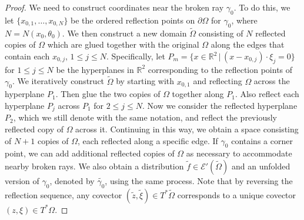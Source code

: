 \documentclass[10pt]{amsart}
\theoremstyle{definition}
\theoremstyle{definition}
\theoremstyle{definition}
\newcommand{ \rn }[1]{\mathbb{R}^{#1}}
\begin{document}
\begin{proof}We need to construct coordinates near the broken ray $\gamma_{0}$. To do this, we let $\{x_{0,1},\ldots, x_{0,N}\}$ be the ordered reflection points on $\partial \Omega$ for $\gamma_{0}$, where $N = N(x_{0}, \theta_{0})$. We then construct a new domain $\widetilde{\Omega}$ consisting of $N$ reflected copies of $\Omega$ which are glued together with the original $\Omega$ along the edges that contain each $x_{0,j}$, $1 \leq j \leq N$. Specifically, let $P_{m}= \{x \in \rn{2} \, | \, (x-x_{0,j}) \cdot \xi_{j} = 0\}$ for $1 \leq j \leq N$ be the hyperplanes in $\rn{2}$ corresponding to the reflection points of $\gamma_{0}$. We iteratively construct $\widetilde{\Omega}$ by starting with $x_{0,1}$ and reflecting $\Omega$ across the hyperplane $P_{1}$. Then glue the two copies of $\Omega$ together along $P_{1}$. Also reflect each hyperplane $P_{j}$ across $P_{1}$ for $2 \leq j \leq N$. Now we consider the reflected hyperplane $P_{2}$, which we still denote with the same notation, and reflect the previously reflected copy of $\Omega$ across it. Continuing in this way, we obtain a space consisting of $N+1$ copies of $\Omega$, each reflected along a specific edge. If $\gamma_{0}$ contains a corner point, we can add additional reflected copies of $\Omega$ as necessary to accommodate nearby broken rays. We also obtain a distribution $\widetilde{f} \in \mathcal{E}'(\widetilde{\Omega})$ and an unfolded version of $\gamma_{0}$, denoted by $\widetilde{\gamma_{0}}$, using the same process. Note that by reversing the reflection sequence, any covector $(\widetilde{z}, \widetilde{\xi}) \in T^{*}\widetilde{\Omega}$ corresponds to a unique covector $(z,\xi) \in T^{*}\Omega$.


\end{proof}
\end{document}

